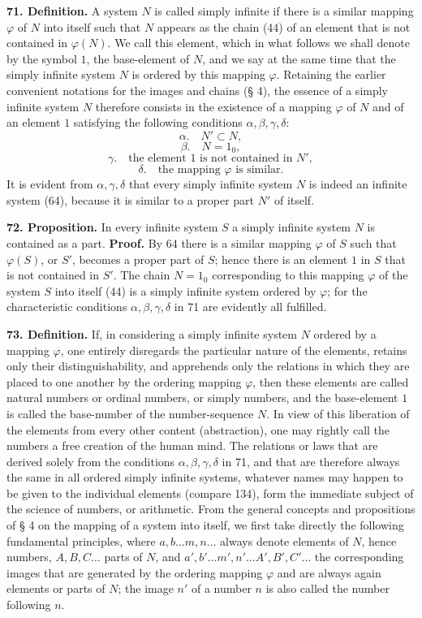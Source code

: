 \documentclass[11pt]{article}
\newcommand{\partof}{\mathrel{\subset}}
\begin{document}
\noindent\textbf{71. Definition.} A system $N$ is called simply infinite if there is a similar mapping $\varphi$ of $N$ into itself such that $N$ appears as the chain (44) of an element that is not contained in $\varphi(N)$. We call this element, which in what follows we shall denote by the symbol $1$, the base-element of $N$, and we say at the same time that the simply infinite system $N$ is ordered by this mapping $\varphi$. Retaining the earlier convenient notations for the images and chains (§ 4), the essence of a simply infinite system $N$ therefore consists in the existence of a mapping $\varphi$ of $N$ and of an element $1$ satisfying the following conditions $\alpha,\beta,\gamma,\delta$:
\[
\alpha.\quad N'\partof N,
\]
\[
\beta.\quad N=1_0,
\]
\[
\gamma.\quad \text{the element } 1 \text{ is not contained in } N',
\]
\[
\delta.\quad \text{the mapping } \varphi \text{ is similar.}
\]
It is evident from $\alpha,\gamma,\delta$ that every simply infinite system $N$ is indeed an infinite system (64), because it is similar to a proper part $N'$ of itself.

\noindent\textbf{72. Proposition.} In every infinite system $S$ a simply infinite system $N$ is contained as a part. \textbf{Proof.} By 64 there is a similar mapping $\varphi$ of $S$ such that $\varphi(S)$, or $S'$, becomes a proper part of $S$; hence there is an element $1$ in $S$ that is not contained in $S'$. The chain $N=1_0$ corresponding to this mapping $\varphi$ of the system $S$ into itself (44) is a simply infinite system ordered by $\varphi$; for the characteristic conditions $\alpha,\beta,\gamma,\delta$ in 71 are evidently all fulfilled.

\noindent\textbf{73. Definition.} If, in considering a simply infinite system $N$ ordered by a mapping $\varphi$, one entirely disregards the particular nature of the elements, retains only their distinguishability, and apprehends only the relations in which they are placed to one another by the ordering mapping $\varphi$, then these elements are called natural numbers or ordinal numbers, or simply numbers, and the base-element $1$ is called the base-number of the number-sequence $N$. In view of this liberation of the elements from every other content (abstraction), one may rightly call the numbers a free creation of the human mind. The relations or laws that are derived solely from the conditions $\alpha,\beta,\gamma,\delta$ in 71, and that are therefore always the same in all ordered simply infinite systems, whatever names may happen to be given to the individual elements (compare 134), form the immediate subject of the science of numbers, or arithmetic. From the general concepts and propositions of § 4 on the mapping of a system into itself, we first take directly the following fundamental principles, where $a,b\ldots m,n\ldots$ always denote elements of $N$, hence numbers, $A,B,C\ldots$ parts of $N$, and $a',b'\ldots m',n'\ldots A',B',C'\ldots$ the corresponding images that are generated by the ordering mapping $\varphi$ and are always again elements or parts of $N$; the image $n'$ of a number $n$ is also called the number following $n$.
\end{document}
